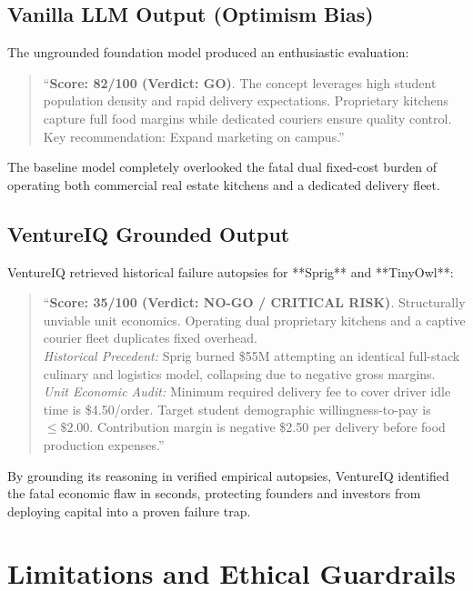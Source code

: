 \documentclass[conference]{IEEEtran}
\begin{document}
\subsection{Vanilla LLM Output (Optimism Bias)}
The ungrounded foundation model produced an enthusiastic evaluation:
\begin{quote}
``\textbf{Score: 82/100 (Verdict: GO)}. The concept leverages high student population density and rapid delivery expectations. Proprietary kitchens capture full food margins while dedicated couriers ensure quality control. Key recommendation: Expand marketing on campus.''
\end{quote}
The baseline model completely overlooked the fatal dual fixed-cost burden of operating both commercial real estate kitchens and a dedicated delivery fleet.

\subsection{VentureIQ Grounded Output}
VentureIQ retrieved historical failure autopsies for **Sprig** and **TinyOwl**:
\begin{quote}
``\textbf{Score: 35/100 (Verdict: NO-GO / CRITICAL RISK)}. Structurally unviable unit economics. Operating dual proprietary kitchens and a captive courier fleet duplicates fixed overhead. \\
\textit{Historical Precedent:} Sprig burned \$55M attempting an identical full-stack culinary and logistics model, collapsing due to negative gross margins. \\
\textit{Unit Economic Audit:} Minimum required delivery fee to cover driver idle time is \$4.50/order. Target student demographic willingness-to-pay is $\le \$2.00$. Contribution margin is negative \$2.50 per delivery before food production expenses.''
\end{quote}
By grounding its reasoning in verified empirical autopsies, VentureIQ identified the fatal economic flaw in seconds, protecting founders and investors from deploying capital into a proven failure trap.

\section{Limitations and Ethical Guardrails}
\end{document}
